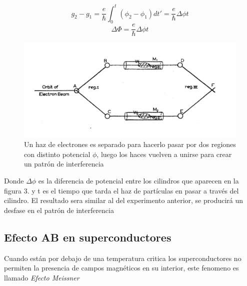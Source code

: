 \documentclass[12pt]{article}
\begin{document}
\begin{equation}
g_2-g_1= \frac{e}{\hbar}\int_{0}^{t} (\phi_2-\phi_1)dt'=\frac{e}{\hbar}\Delta \phi t 
\end{equation}
\begin{equation}
\boxed{\Delta \Phi = \frac{e}{\hbar}\Delta \phi t}
\end{equation}

\begin{figure}[H]
\centering
\includegraphics[scale=1]{img/electricAB.png}
\caption{Un haz de electrones es separado para hacerlo pasar por dos regiones con distinto potencial $\phi$, luego los haces vuelven a unirse para crear un patrón de interferencia}
\end{figure}

Donde $\Delta \phi$ es la diferencia de potencial entre los cilindros que aparecen en la figura 3. y t es el tiempo que tarda el haz de partículas en pasar a través del cilindro.
El resultado sera similar al del experimento anterior, se producirá un desfase en el patrón de interferencia 

\subsection{Efecto AB en superconductores}
Cuando están por debajo de una temperatura critica los superconductores no permiten la presencia de campos magnéticos en su interior, este fenomeno es llamado \textit{Efecto Meissner} 
\end{document}
